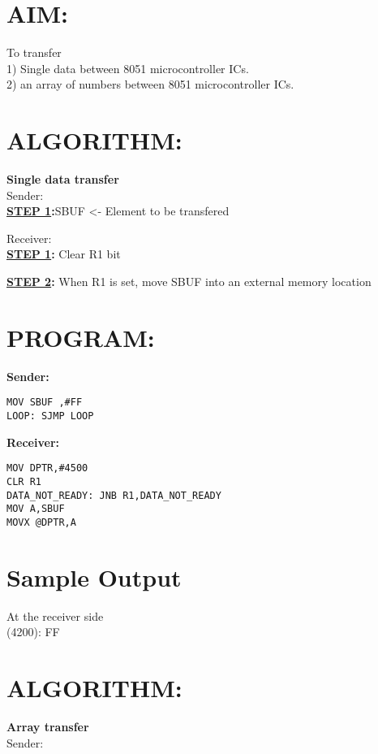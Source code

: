 
%
%
%
%
\section*{AIM:}
To transfer \\
 1) Single data between 8051 microcontroller ICs.\\
 2) an array of numbers  between 8051 microcontroller ICs.

\section*{ALGORITHM:}
\textbf{Single data transfer}\\
\large{Sender:}\\

\textbf{\underline{STEP 1}:}SBUF <- Element to be transfered

\large{Receiver:}\\
\textbf{\underline{STEP 1}:} Clear R1 bit 

\textbf{\underline{STEP 2}:} When R1 is set, move SBUF into an external memory location



\section*{PROGRAM:}
\textbf{Sender:}
\begin{lstlisting}
MOV SBUF ,#FF
LOOP: SJMP LOOP
\end{lstlisting}

\vspace{20pt}

\textbf{Receiver:}
\begin{lstlisting}
MOV DPTR,#4500
CLR R1 
DATA_NOT_READY: JNB R1,DATA_NOT_READY
MOV A,SBUF
MOVX @DPTR,A
\end{lstlisting}




\section*{Sample Output}
At the receiver side\\
(4200): FF

\vspace{30pt}

\section*{ALGORITHM:}
\textbf{Array transfer}\\
\large{Sender:}\\


